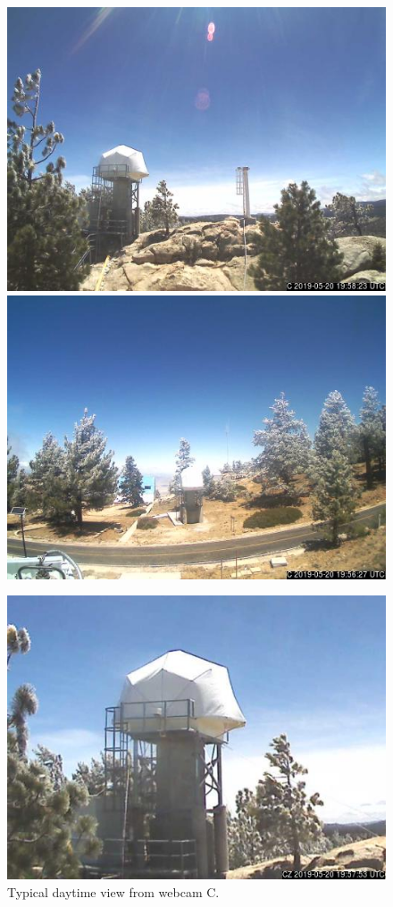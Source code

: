 \begin{figure}[t]
\begin{center}
\ifcoatlioan
\includegraphics[height=0.6\linewidth]{figures/coatli-webcam-c.jpg}
\fi
\ifddotioan
\includegraphics[height=0.6\linewidth]{figures/ddoti-webcam-c.jpg}
\fi
\end{center}
\caption{Typical daytime view from {\projectname} webcam C.}
\label{figure:webcam-c-view}
\begin{center}
\ifcoatlioan
\includegraphics[height=0.6\linewidth]{figures/coatli-webcam-cz.jpg}

\end{center}
\end{figure}
